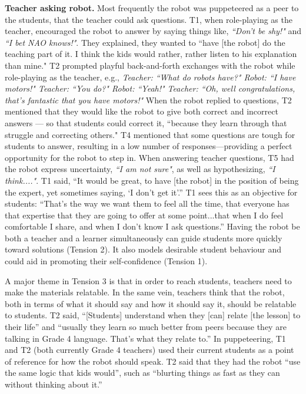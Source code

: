 \textbf{Teacher asking robot.} Most frequently the robot was puppeteered as a peer to the students, that the teacher could ask questions. T1, when role-playing as the teacher, encouraged the robot to answer by saying things like, \textit{``Don't be shy!"} and \textit{``I bet NAO knows!"}. They explained, they wanted to ``have [the robot] do the teaching part of it. I think the kids would rather, rather listen to his explanation than mine." T2 prompted playful back-and-forth exchanges with the robot while role-playing as the teacher, e.g., \textit{Teacher: ``What do robots have?" Robot: ``I have motors!" Teacher: ``You do?" Robot: ``Yeah!" Teacher: ``Oh, well congratulations, that's fantastic that you have motors!"} When the robot replied to questions, T2 mentioned that they would like the robot to give both correct and incorrect answers --- so that students could correct it, ``because they learn through that struggle and correcting others." T4 mentioned that some questions are tough for students to answer, resulting in a low number of responses---providing a perfect opportunity for the robot to step in. When answering teacher questions, T5 had the robot express uncertainty, \textit{``I am not sure"}, as well as hypothesizing, \textit{``I think...."}. T1 said, ``It would be great, to have [the robot] in the position of being the expert, yet sometimes saying, `I don't get it'.''  T1 sees this as an objective for students: ``That's the way we want them to feel all the time, that everyone has that expertise that they are going to offer at some point...that when I do feel comfortable I share, and when I don't know I ask questions.'' Having the robot be both a teacher and a learner simultaneously can guide students more quickly toward solutions (Tension 2). It also models desirable student behaviour and could aid in promoting their self-confidence (Tension 1). 

A major theme in Tension 3 is that in order to reach students, teachers need to make the materials relatable.  In the same vein, teachers think that the robot, both in terms of what it should say and how it should say it, should be relatable to students.  T2 said, ``[Students] understand when they [can] relate [the lesson] to their life'' and ``usually they learn so much better from peers because they are talking in Grade 4 language. That's what they relate to.''  In puppeteering, T1 and T2 (both currently Grade 4 teachers) used their current students as a point of reference for how the robot should speak.  T2 said that they had the robot ``use the same logic that kids would'', such as ``blurting things as fast as they can without thinking about it.'' \\

